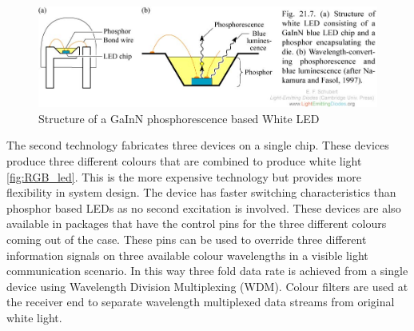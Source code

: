 \begin{figure}[!hbtp]
\centering
\includegraphics[angle=0,width=\figwidth]{./Figures/slide0011_image007.jpg}
\caption[Structure of a phosphorescence white LED]{Structure of a GaInN phosphorescence based White LED \cite{ledStructure}}%
 \label{fig:phosphor_led}
\end{figure}


The second technology fabricates three devices on a single chip. These devices produce three different colours that are combined to produce white light \ref{fig:RGB_led}. This is the more expensive technology but provides more flexibility in system design. The device has faster switching characteristics than phosphor based LEDs \cite{le2008high} as no second excitation is involved. These devices are also available in packages that have the control pins for the three different colours coming out of the case. These pins can be used to override three different information signals on three available colour wavelengths in a visible light communication scenario. In this way three fold data rate is achieved from a single device using Wavelength Division Multiplexing (WDM). Colour filters are used at the receiver end to separate wavelength multiplexed data streams from original white light.

